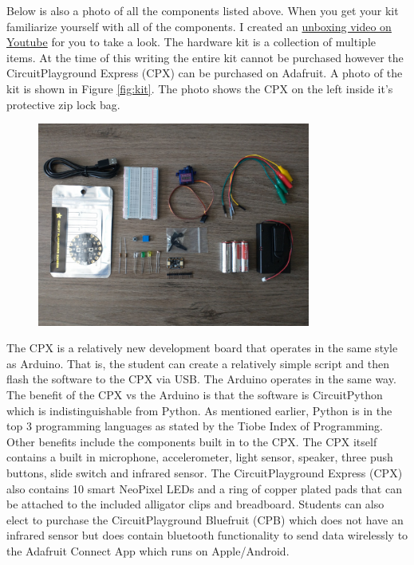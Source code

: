 Below is also a photo of all the components listed above. When you get
your kit familiarize yourself with all of the components. I created
an \href{https://youtu.be/6sNNQrhnzLE}{unboxing video on Youtube} 
for you to take a look. The hardware kit is a collection of multiple
items. At the time of this writing the entire kit cannot be purchased
however the CircuitPlayground Express (CPX) can be purchased on
Adafruit\cite{AdafruitMAIN}. A photo of the kit is shown in
Figure \ref{fig:kit}. The photo shows the CPX on the left inside it's
protective zip lock bag.

\begin{figure}[H]
  \begin{center}
    \includegraphics[width=0.8\textwidth]{Figures/components.png}
  \end{center}
\end{figure}

The CPX is a relatively new development board that operates in the
same style as Arduino\cite{Arduino}. That is, the student can
create a relatively simple script and then flash the software to the
CPX via USB. The Arduino operates in the same way. The benefit of the
CPX vs the Arduino is that the software is CircuitPython which is
indistinguishable from Python. As mentioned earlier, Python is in the
top 3 programming languages as stated by the Tiobe Index of
Programming\cite{Tiobe}. Other benefits include the components
built in to the CPX. The CPX itself contains a built in microphone,
accelerometer, light sensor, speaker, three push buttons, slide switch
and infrared sensor. The CircuitPlayground Express (CPX) also contains
10 smart NeoPixel LEDs and a ring of copper plated pads that can be
attached to the included alligator clips and breadboard. Students can
also elect to purchase the CircuitPlayground Bluefruit (CPB) which
does not have an infrared sensor but does contain bluetooth
functionality to send data wirelessly to the Adafruit Connect App
which runs on Apple/Android\cite{AdafruitBLE}.

